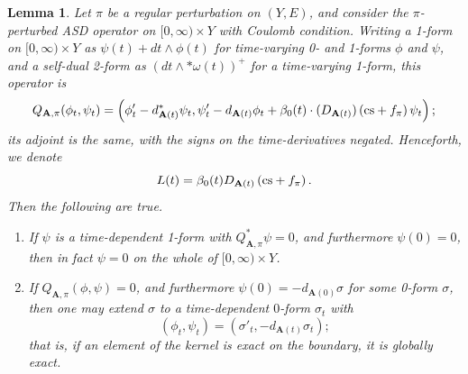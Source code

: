 \documentclass[10pt,a4paper]{amsart}
\newtheorem{lemma}[theorem]{Lemma}
\theoremstyle{definition}
\theoremstyle{remark}
\numberwithin{figure}{qchap}
\begin{document}
\begin{lemma}\label{ker-end}Let $\pi$ be a regular perturbation on $(Y, E)$, and consider the $\pi$-perturbed ASD operator on $[0,\infty) \times Y$ with Coulomb condition. 
Writing a 1-form on $[0,\infty) \times Y$ as $\psi(t) + dt \wedge \phi(t)$ for time-varying 0- and 1-forms $\phi$ and $\psi$, and a self-dual 2-form as $(dt \wedge *\omega(t))^+$ for a time-varying 1-form, this operator is
$$Q_{\mathbf{A},\pi}(\phi_t, \psi_t) = \left(\phi'_t - d_{\mathbf{A}(t)}^* \psi_t, \psi'_t - d_{\mathbf{A}(t)} \phi_t + \beta_0(t) \cdot (D_{\mathbf{A}(t)})\left(\textup{cs}+f_\pi\right)\psi_t\right);$$ 
its adjoint is the same, with the signs on the time-derivatives negated. Henceforth, we denote $$L(t) = \beta_0(t) D_{\mathbf{A}(t)}\left(\textup{cs}+f_\pi\right).$$
Then the following are true.
\begin{enumerate}
\item If $\psi$ is a time-dependent 1-form with $Q^*_{\mathbf{A},\pi}\psi = 0$, and furthermore $\psi(0) = 0$, then in fact $\psi = 0$ on the whole of $[0,\infty) \times Y$. 
\item If $Q_{\mathbf{A},\pi}(\phi, \psi) = 0$, and furthermore $\psi(0) = -d_{\mathbf{A}(0)} \sigma$ for some 0-form $\sigma$, then one may extend $\sigma$ to a time-dependent $0$-form $\sigma_t$ with 
$$(\phi_t, \psi_t) = (\sigma'_t, -d_{\mathbf{A}(t)} \sigma_t);$$ 
that is, if an element of the kernel is exact on the boundary, it is globally exact.
\end{enumerate}
\end{lemma}
\end{document}
